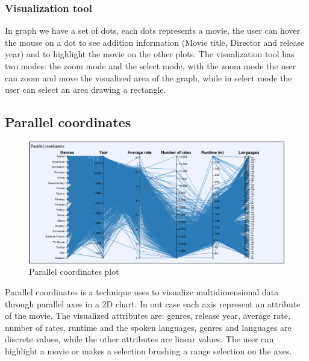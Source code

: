 \documentclass[]{article}
\begin{document}
\subsubsection{Visualization tool}
In graph we have a set of dots, each dots represents a movie, the user can hover the mouse on a dot to see addition information (Movie title, Director and release year) and to highlight the movie on the other plots.\newline
The visualization tool has two modes: the zoom mode and the select mode, with the zoom mode the user can zoom and move the visualized area of the graph, while in select mode the user can select an area drawing a rectangle.
\subsection{Parallel coordinates}
\begin{figure}[H]
	\centering
	\includegraphics[width=1\linewidth]{images/parallel_plot}
	\caption{Parallel coordinates plot}
	\label{fig:parallelplot}
\end{figure}
Parallel coordinates is a technique uses to visualize multidimensional data through parallel axes in a 2D chart. In out case each axis represent an attribute of the movie.\newline
The visualized attributes are: genres, release year, average rate, number of rates, runtime and the spoken languages, genres and languages are discrete values, while the other attributes are linear values.\newline
The user can highlight a movie or makes a selection brushing a range selection on the axes.
\end{document}
